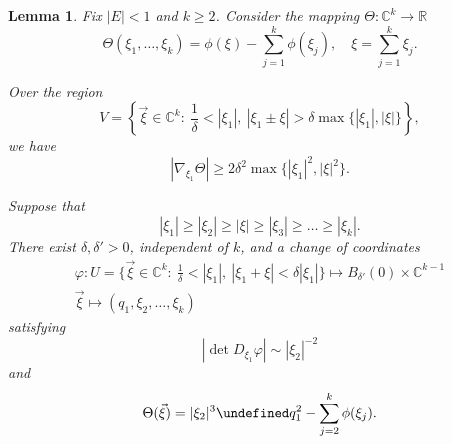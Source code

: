 \documentclass[a4paper,
11pt,  reqno]{amsart}
\newcommand{\5}{\textup{V}}
\newcommand{\noi}{\noindent}
\newtheorem{lemma}[theorem]{Lemma}
\theoremstyle{remark}
\newcommand{\R}{\mathbb{R}}
\newcommand{\CC}{\mathbb{C}}
\let\Re=\undefined\DeclareMathOperator*{\Re}{Re}
\numberwithin{equation}{section}
\numberwithin{theorem}{section}
\begin{document}
\begin{lemma}\label{lem:prop_resonance}
Fix $|E|<1$ and $k\ge 2$. Consider the mapping $\Theta:\CC^{k}\to \R$
$$
\Theta(\xi_1,\dots, \xi_{k})= \phi(\xi)-\sum_{j=1}^k \phi(\xi_j),\quad \xi=\sum_{j=1}^{k} \xi_j.
$$

\noi{\rm (i)} Over the region
\begin{equation}
V=\left\{\vec{\xi}\in \CC^{k} :\  \frac{1}{\delta}<|\xi_1|,\  |\xi_1\pm\xi|>\delta\max\{|\xi_1|, |\xi|\}\right\},
\end{equation}
we have
$$
|\nabla_{\xi_1}\Theta|\ge 2\delta^2\max\{|\xi_1|^2, |\xi|^2\}.
$$

\noi{\rm (ii)} Suppose that
$$
|\xi_1|\ge |\xi_2| \ge |\xi|\ge |\xi_3|\ge \dots \ge |\xi_k|.
$$
There exist $\delta, \delta'>0$, independent of $k$, and a change of coordinates
\begin{align*}
\varphi:U=\{\vec{\xi}\in \CC^{k} :\  \tfrac{1}{\delta}<|\xi_1|,\  |\xi_1+\xi|<\delta|\xi_1|\} \mapsto B_{\delta'}(0)\times \CC^{k-1}\\ \vec{\xi}\mapsto (q_1, \xi_2, \dots, \xi_k)
\end{align*}
satisfying
\begin{equation}\label{eq:nondeg}
|\det D_{\xi_1}\varphi| \sim |\xi_2|^{-2}
\end{equation}
and
$$
\Theta(\vec{\xi})=|\xi_2|^3\Re q_1^2 - \sum_{j=2}^k \phi(\xi_j).
$$

\end{lemma}
\end{document}
